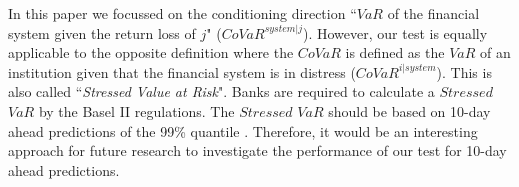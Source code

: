 \documentclass[12pt]{article}
\begin{document}
In this paper we focussed on the conditioning direction ``$VaR$ of the financial system given the return loss of $j$" ($CoVaR^{system|j}$). However, our test is equally applicable to the opposite definition where the $CoVaR$ is defined as the $VaR$ of an institution given that the financial system is in distress ($CoVaR^{i|system}$). This is also called ``\textit{Stressed Value at Risk}". Banks are required to calculate a $Stressed$ $VaR$ by the Basel II regulations. The $Stressed$ $VaR$ should be based on 10-day ahead predictions of the 99\% quantile \citep[][p. 14]{baselii}. Therefore, it would be an interesting approach for future research to investigate the performance of our test for 10-day ahead predictions.








\end{document}
